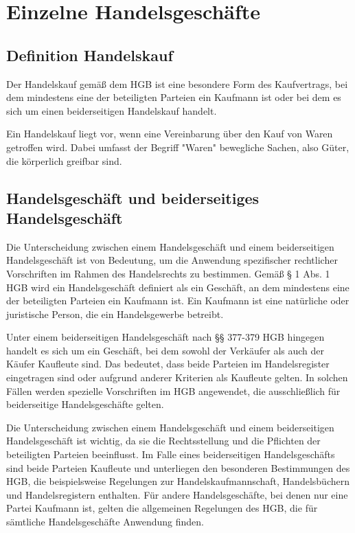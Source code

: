 
\chapter[Einzelne Handelsgeschäfte]{Einzelne Handelsgeschäfte}

\section{Definition Handelskauf}
Der Handelskauf gemäß dem HGB ist eine besondere Form des Kaufvertrags, bei dem mindestens eine der beteiligten Parteien ein Kaufmann ist oder bei dem es sich um einen beiderseitigen Handelskauf handelt.

Ein Handelskauf liegt vor, wenn eine Vereinbarung über den Kauf von Waren getroffen wird. Dabei umfasst der Begriff "Waren" bewegliche Sachen, also Güter, die körperlich greifbar sind.


\section{Handelsgeschäft und beiderseitiges Handelsgeschäft}
Die Unterscheidung zwischen einem Handelsgeschäft und einem beiderseitigen Handelsgeschäft ist von Bedeutung, um die Anwendung spezifischer rechtlicher Vorschriften im Rahmen des Handelsrechts zu bestimmen. Gemäß § 1 Abs. 1 HGB wird ein Handelsgeschäft definiert als ein Geschäft, an dem mindestens eine der beteiligten Parteien ein Kaufmann ist. Ein Kaufmann ist eine natürliche oder juristische Person, die ein Handelsgewerbe betreibt.

Unter einem beiderseitigen Handelsgeschäft nach §§ 377-379 HGB hingegen handelt es sich um ein Geschäft, bei dem sowohl der Verkäufer als auch der Käufer Kaufleute sind. Das bedeutet, dass beide Parteien im Handelsregister eingetragen sind oder aufgrund anderer Kriterien als Kaufleute gelten. In solchen Fällen werden spezielle Vorschriften im HGB angewendet, die ausschließlich für beiderseitige Handelsgeschäfte gelten.

Die Unterscheidung zwischen einem Handelsgeschäft und einem beiderseitigen Handelsgeschäft ist wichtig, da sie die Rechtsstellung und die Pflichten der beteiligten Parteien beeinflusst. Im Falle eines beiderseitigen Handelsgeschäfts sind beide Parteien Kaufleute und unterliegen den besonderen Bestimmungen des HGB, die beispielsweise Regelungen zur Handelskaufmannschaft, Handelsbüchern und Handelsregistern enthalten. Für andere Handelsgeschäfte, bei denen nur eine Partei Kaufmann ist, gelten die allgemeinen Regelungen des HGB, die für sämtliche Handelsgeschäfte Anwendung finden.
